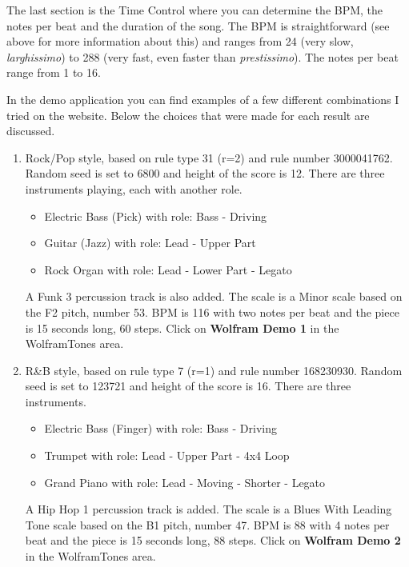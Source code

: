 \documentclass[12pt]{article}
\begin{document}
The last section is the Time Control where you can determine the BPM, the notes per beat and the duration of the song. The BPM is straightforward (see above for more information about this) and ranges from 24 (very slow, \textit{larghissimo}) to 288 (very fast, even faster than \textit{prestissimo}).
The notes per beat range from 1 to 16.
\newline

In the demo application you can find examples of a few different combinations I tried on the website. Below the choices that were made for each result are discussed.

\begin{enumerate}
\item Rock/Pop style, based on rule type 31 (r=2) and rule number 3000041762. Random seed is set to 6800 and height of the score is 12. There are three instruments playing, each with another role.
\begin{itemize}
\item Electric Bass (Pick) with role: Bass - Driving
\item Guitar (Jazz) with role: Lead - Upper Part
\item Rock Organ with role: Lead - Lower Part - Legato 
\end{itemize}
A Funk 3 percussion track is also added. The scale is a Minor scale based on the F2 pitch, number 53. BPM is 116 with two notes per beat and the piece is 15 seconds long, 60 steps. Click on \textbf{Wolfram Demo 1} in the WolframTones area.

\item R\&B style, based on rule type 7 (r=1) and rule number 168230930. Random seed is set to 123721 and height of the score is 16.
There are three instruments.
\begin{itemize}
\item Electric Bass (Finger) with role: Bass - Driving
\item Trumpet with role: Lead - Upper Part - 4x4 Loop
\item Grand Piano with role: Lead - Moving - Shorter - Legato 
\end{itemize}
A Hip Hop 1 percussion track is added. The scale is a Blues With Leading Tone scale based on the B1 pitch, number 47. BPM is 88 with 4 notes per beat and the piece is 15 seconds long, 88 steps. Click on \textbf{Wolfram Demo 2} in the WolframTones area.


\end{enumerate}
\end{document}
